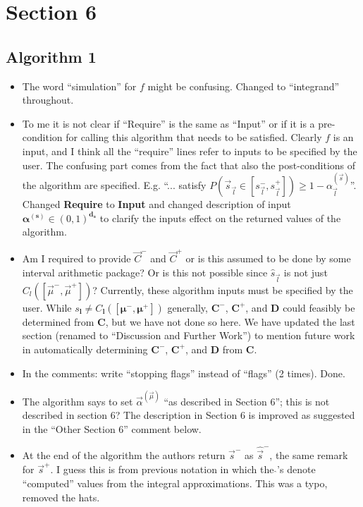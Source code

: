 \documentclass{article}[12pt]
\newcommand{\Referee}[1]{{\color{blue} #1 \newline}}
\begin{document}
\section*{Section 6}

\subsection*{Algorithm 1}

\begin{itemize}
    \item \Referee{The word ``simulation'' for $f$ might be confusing.}Changed to ``integrand'' throughout.
    \item \Referee{To me it is not clear if ``Require'' is the same as ``Input'' or if it is a pre-condition for calling this algorithm that needs to be satisfied. Clearly $f$ is an input, and I think all the ``require'' lines refer to inputs to be specified by the user. The confusing part comes from the fact that also the post-conditions of the algorithm are specified. E.g. ``... satisfy $P(\vec{s}_{\vec{l}} \in [s_{\vec{l}}^-, s_{\vec{l}}^+]) \ge 1 -\alpha_{\vec{l}}^{(\vec{s})}$''.}Changed \textbf{Require} to \textbf{Input} and changed description of  input $\boldsymbol{\alpha}^{(\boldsymbol{s})} \in (0,1)^{\boldsymbol{d}_{\boldsymbol{s}}}$ to clarify the inputs effect on the returned values of the algorithm.
    \item \Referee{Am I required to provide $\vec{C}^-$ and $\vec{C}^+$ or is this assumed to be done by some interval arithmetic package? Or is this not possible since $\hat{s}_{\vec{l}}$ is not just $C_l([\vec{\mu}^-,\vec{\mu}^+])$?}Currently, these algorithm inputs must be specified by the user. While $s_{\boldsymbol{l}} \neq C_{\boldsymbol{l}}([\boldsymbol{\mu}^-,\boldsymbol{\mu}^+])$ generally, $\boldsymbol{C}^-$, $\boldsymbol{C}^+$, and $\boldsymbol{D}$ could feasibly be determined from $\boldsymbol{C}$, but we have not done so here. We have updated the last section (renamed to ``Discussion and Further Work'') to mention future work in automatically determining $\boldsymbol{C}^-$, $\boldsymbol{C}^+$, and $\boldsymbol{D}$ from $\boldsymbol{C}$.
    \item \Referee{In the comments: write ``stopping flags'' instead of ``flags'' (2 times).}Done.
    \item \Referee{The algorithm says to set ${\vec{\alpha}}^{(\vec{\mu})}$ ``as described in Section 6''; this is not described in section 6?}The  description in Section 6 is improved as suggested in the ``Other Section 6'' comment below. 
    \item \Referee{At the end of the algorithm the authors return $\vec{s}^-$ as $\hat{\vec{s}}^-$, the same remark for $\vec{s}^+$. I guess this is from previous notation in which the $\hat{}$'s denote ``computed'' values from the integral approximations.}This was a typo, removed the hats.
\end{itemize}
\end{document}
